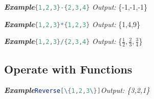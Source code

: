 \documentclass[10pt]{book}
\newcommand{\iocode}[2]{\lstinline[language=Mathematica]|#1|\hspace{\fill}\emph{Output: #2}}
\newcommand{\egio}[2]{\noindent\emph{\textbf{Example}}\quad\iocode{#1}{#2}}
\begin{document}
\noindent\emph{\textbf{Example}}\quad \lstinline[language=Mathematica]|{1,2,3}-{2,3,4}| \hspace{\fill}\emph{Output:} \{-1,-1,-1\}

\noindent\emph{\textbf{Example}}\quad \lstinline[language=Mathematica]|{1,2,3}*{1,2,3}| \hspace{\fill}\emph{Output:} \{1,4,9\}

\noindent\emph{\textbf{Example}}\quad \lstinline[language=Mathematica]|{1,2,3}/{2,3,4}| \hspace{\fill}\emph{Output:} \{$\frac{1}{2},\frac{2}{3},\frac{3}{4}$\}

\subsection{Operate with Functions}


\egio{Reverse[\{1,2,3\}]}{\{3,2,1\}}
\end{document}

